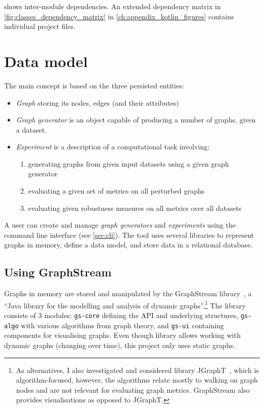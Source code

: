  shows inter-module dependencies.
An extended dependency matrix in \cref{fig:classes_dependency_matrix} in \cref{ch:appendix_kotlin_figures} contains individual project files.

\section{Data model}

The main concept is based on the three persisted entities:
\begin{itemize}[topsep=5pt]
    \item \textsl{Graph} storing its nodes, edges (and their attributes)
    \item \textsl{Graph generator} is an object capable of producing a number of graphs, given a dataset.
    \item \textsl{Experiment} is a description of a computational task involving:
    \begin{enumerate}[topsep=0pt,itemsep=0pt]
        \item generating graphs from given input datasets using a given graph generator
        \item evaluating a given set of metrics on all perturbed graphs
        \item evaluating given robustness measures on all metrics over all datasets
    \end{enumerate}
\end{itemize}

A user can create and manage \textsl{graph generators} and \textsl{experiments} using the command line interface (see \autoref{sec:cli}).
The \graffs tool uses several libraries to represent graphs in memory, define a data model, and store data in a relational database.

\subsection{Using GraphStream}\label{sec:graphstream}

Graphs in memory are stored and manipulated by the GraphStream library~\cite{DutotGraphStreamToolBridging2007}, a \enquote{Java library for the modelling and analysis of dynamic graphs}.\footnote{As alternatives, I also investigated and considered library JGraphT~\cite{Michail2019}, which is algorithm-focused, however, the algorithms relate mostly to walking on graph nodes and are not relevant for evaluating graph metrics.
GraphStream also provides visualisations as opposed to JGraphT.}
The library consists of 3 modules: \texttt{gs-core} defining the API and underlying structures, \texttt{gs-algo} with various algorithms from graph theory, and \texttt{gs-ui} containing components for visualising graphs.
Even though library allows working with dynamic graphs (changing over time), this project only uses static graphs.


